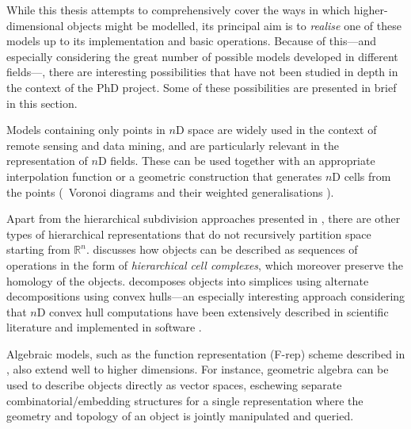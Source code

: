 While this thesis attempts to comprehensively cover the ways in which higher-dimensional objects might be modelled, its principal aim is to \emph{realise} one of these models up to its implementation and basic operations.
Because of this---and especially considering the great number of possible models developed in different fields---, there are interesting possibilities that have not been studied in depth in the context of the PhD project.
Some of these possibilities are presented in brief in this section.

Models containing only points in $n$D space \citep{Pasko01} are widely used in the context of remote sensing and data mining, and are particularly relevant in the representation of $n$D fields.
These can be used together with an appropriate interpolation function \citep{Miller97} or a geometric construction that generates $n$D cells from the points (\eg\ Voronoi diagrams \citep{Ledoux06} and their weighted generalisations \citep{Edelsbrunner14}).


Apart from the hierarchical subdivision approaches presented in , there are other types of hierarchical representations that do not recursively partition space starting from $\mathbb{R}^n$.
\citet{Comic14} discusses how objects can be described as sequences of operations in the form of \emph{hierarchical cell complexes}, which moreover preserve the homology of the objects.
\citet{Bulbul09a} decomposes objects into simplices using alternate decompositions using convex hulls---an especially interesting approach considering that $n$D convex hull computations have been extensively described in scientific literature and implemented in software \citep{Lawson86,Seidel86,Barber96}.

Algebraic models, such as the function representation (F-rep) scheme \citep{Pasko95} described in , also extend well to higher dimensions.
For instance, geometric algebra \citep{Artin11} can be used to describe objects directly as vector spaces, eschewing separate combinatorial/embedding structures for a single representation where the geometry and topology of an object is jointly manipulated and queried.

